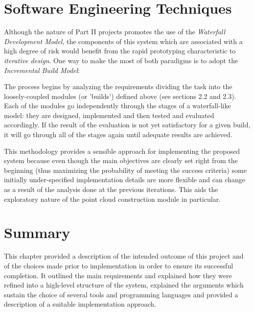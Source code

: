 \documentclass[12pt,a4paper,twoside,openright]{report}
\begin{document}
\section{Software Engineering Techniques}
Although the nature of Part II projects promotes the use of the \emph{Waterfall Development Model}, the components of this system which are associated with a high degree of risk would benefit from the rapid prototyping characteristic to \emph{iterative design}. One way to make the most of both paradigms is to adopt the \emph{Incremental Build Model}:\\
\begin{adjustwidth}{0.7cm}{}
The process begins by analyzing the requirements dividing the task into the loosely-coupled modules (or 'builds') defined above (see sections 2.2 and 2.3). Each of the modules go independently through the stages of a waterfall-like model: they are designed, implemented and then tested and evaluated accordingly. If the result of the evaluation is not yet satisfactory for a given build, it will go through all of the stages again until adequate results are achieved.\\
\end{adjustwidth} 
This methodology provides a sensible approach for implementing the proposed system because even though the main objectives are clearly set right from the beginning (thus maximizing the probability of meeting the success criteria) some initially under-specified implementation details are more flexible and can change as a result of the analysis done at the previous iterations. This aids the exploratory nature of the point cloud construction module in particular.  

\section{Summary}
This chapter provided a description of the intended outcome of this project and of the choices made prior to implementation in order to ensure its successful completion. It outlined the main requirements and explained how they were refined into a high-level structure of the system, explained the arguments which sustain the choice of several tools and programming languages and provided a description of a suitable implementation approach.
\end{document}
